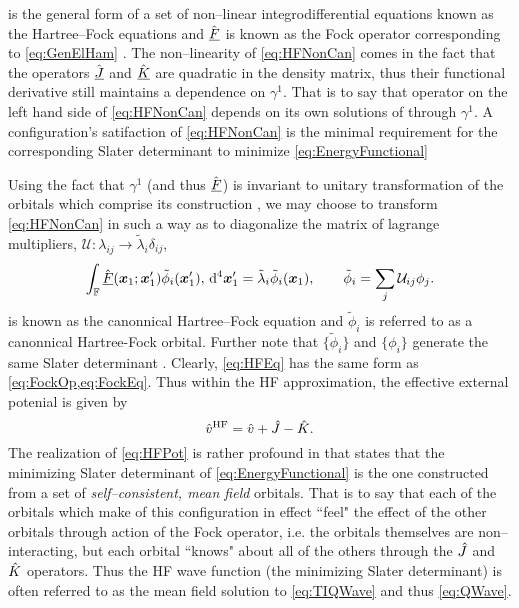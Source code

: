  is the general form of a set of non--linear integrodifferential equations known as the Hartree--Fock equations and $\hat{\underline{F}}$ is
known as the Fock operator corresponding to \cref{eq:GenElHam} . The non--linearity of \cref{eq:HFNonCan} comes in the fact that the operators
$\hat{\underline{J}}$ and $\hat{\underline{K}}$ are quadratic in the density matrix, thus their functional derivative still maintains a dependence on $\gamma^1$. That is to
say that operator on the left hand side of \cref{eq:HFNonCan} depends on its own solutions of through $\gamma^1$. A configuration's satifaction of
\cref{eq:HFNonCan} is the minimal requirement for the corresponding Slater determinant to minimize \cref{eq:EnergyFunctional}

Using the fact that $\gamma^1$ (and thus $\hat{\underline{F}}$) is invariant to unitary transformation of the orbitals which comprise its construction \cite{Ostlund12_book,Yang89_book},
we may choose to transform \cref{eq:HFNonCan} in such a way as to diagonalize the matrix of lagrange multipliers, 
$\mathcal U: \lambda_{ij} \rightarrow \tilde\lambda_{i} \delta_{ij}$,
\begin{equation}
\label{eq:HFEq}
\int_{\mathbb F} \hat{\underline{F}}(\boldsymbol{x}_1; \boldsymbol{x}_1') \tilde\phi_i(\boldsymbol{x}_1'), \,\mathrm{d}^4\boldsymbol{x}'_1 = \tilde\lambda_i \tilde\phi_i(\boldsymbol{x}_1), 
  \qquad \tilde\phi_i = \sum_j\mathcal U_{ij}\phi_j. 
\end{equation}
 is known as the canonnical Hartree--Fock equation and $\tilde \phi_i$ is referred to as a canonnical Hartree-Fock orbital. 
Further note that $\{\tilde \phi_i\}$ and $\{\phi_i\}$ generate the same Slater determinant .
Clearly, \cref{eq:HFEq} has the same form as \cref{eq:FockOp,eq:FockEq}. Thus within the HF approximation, the effective external potenial
is given by
\begin{equation}
\label{eq:HFPot}
\hat{v}^\mathrm{HF} = \hat{v} + \hat{J} - \hat{K}.
\end{equation}
The realization of \cref{eq:HFPot} is rather profound in that states that the minimizing Slater determinant of \cref{eq:EnergyFunctional}
is the one constructed from a set of \emph{self--consistent, mean field} orbitals. That is to say that each of the orbitals which make of
this configuration in effect ``feel" the effect of the other orbitals through action of the Fock operator, i.e. the orbitals themselves 
are non--interacting, but each orbital ``knows" about all of the others through the $\hat{J}$ and $\hat{K}$ operators. Thus the HF wave function
(the minimizing Slater determinant) is often referred to as the mean field solution to \cref{eq:TIQWave} and thus \cref{eq:QWave}.






